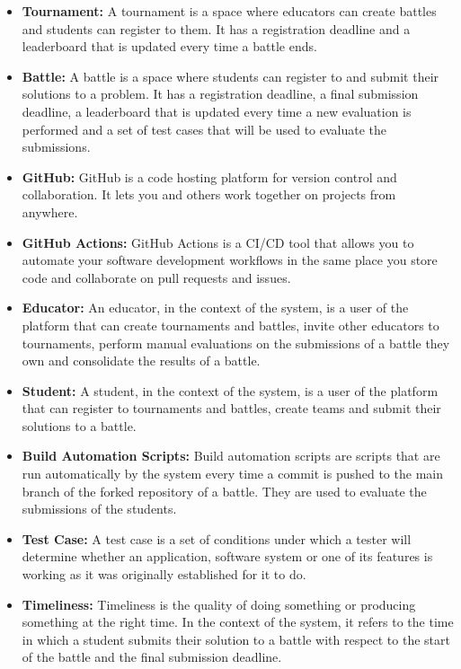 \documentclass{article}
\begin{document}
\begin{itemize}
    \item \textbf{Tournament:} A tournament is a space where educators can create battles and students can register to them. It has a registration deadline and a leaderboard that is updated every time a battle ends.
    \item \textbf{Battle:} A battle is a space where students can register to and submit their solutions to a problem. It has a registration deadline, a final submission deadline, a leaderboard that is updated every time a new evaluation is performed and a set of test cases that will be used to evaluate the submissions.
    \item \textbf{GitHub:} GitHub is a code hosting platform for version control and collaboration. It lets you and others work together on projects from anywhere.
    \item \textbf{GitHub Actions:} GitHub Actions is a CI/CD tool that allows you to automate your software development workflows in the same place you store code and collaborate on pull requests and issues.
    \item \textbf{Educator:} An educator, in the context of the system, is a user of the platform that can create tournaments and battles, invite other educators to tournaments, perform manual evaluations on the submissions of a battle they own and consolidate the results of a battle.
    \item \textbf{Student:} A student, in the context of the system, is a user of the platform that can register to tournaments and battles, create teams and submit their solutions to a battle.
    \item \textbf{Build Automation Scripts:} Build automation scripts are scripts that are run automatically by the system every time a commit is pushed to the main branch of the forked repository of a battle. They are used to evaluate the submissions of the students.
    \item \textbf{Test Case:} A test case is a set of conditions under which a tester will determine whether an application, software system or one of its features is working as it was originally established for it to do.
    \item \textbf{Timeliness:} Timeliness is the quality of doing something or producing something at the right time. In the context of the system, it refers to the time in which a student submits their solution to a battle with respect to the start of the battle and the final submission deadline.
\end{itemize}
\end{document}
